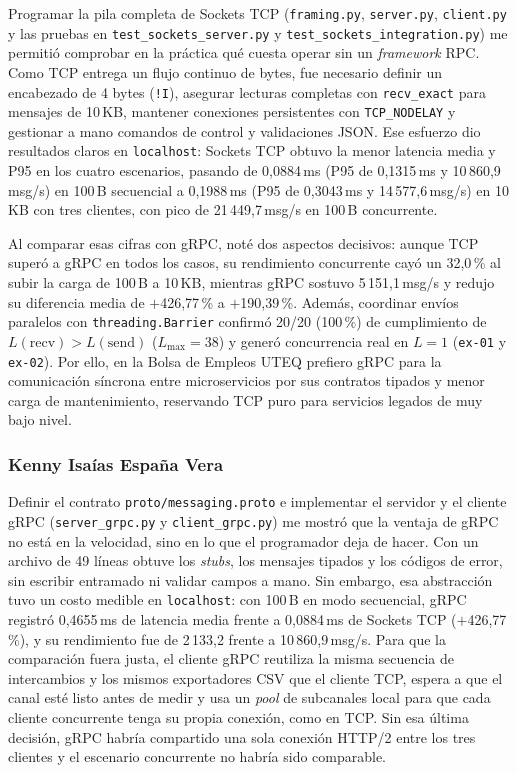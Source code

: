 \documentclass[12pt,a4paper]{article}
\begin{document}
Programar la pila completa de Sockets TCP (\texttt{framing.py}, \texttt{server.py}, \texttt{client.py} y las pruebas en \texttt{test\_sockets\_server.py} y \texttt{test\_sockets\_integration.py}) me permitió comprobar en la práctica qué cuesta operar sin un \emph{framework} RPC. Como TCP entrega un flujo continuo de bytes, fue necesario definir un encabezado de 4 bytes (\texttt{!I}), asegurar lecturas completas con \texttt{recv\_exact} para mensajes de 10\,KB, mantener conexiones persistentes con \texttt{TCP\_NODELAY} y gestionar a mano comandos de control y validaciones JSON. Ese esfuerzo dio resultados claros en \texttt{localhost}: Sockets TCP obtuvo la menor latencia media y P95 en los cuatro escenarios, pasando de 0,0884\,ms (P95 de 0,1315\,ms y 10\,860,9\,msg/s) en 100\,B secuencial a 0,1988\,ms (P95 de 0,3043\,ms y 14\,577,6\,msg/s) en 10\,KB con tres clientes, con pico de 21\,449,7\,msg/s en 100\,B concurrente.

Al comparar esas cifras con gRPC, noté dos aspectos decisivos: aunque TCP superó a gRPC en todos los casos, su rendimiento concurrente cayó un 32,0\,\% al subir la carga de 100\,B a 10\,KB, mientras gRPC sostuvo 5\,151,1\,msg/s y redujo su diferencia media de $+$426,77\,\% a $+$190,39\,\%. Además, coordinar envíos paralelos con \texttt{threading.Barrier} confirmó 20/20 (100\,\%) de cumplimiento de $L(\mathrm{recv}) > L(\mathrm{send})$ ($L_{\max}=38$) y generó concurrencia real en $L=1$ (\texttt{ex-01} y \texttt{ex-02}). Por ello, en la Bolsa de Empleos UTEQ prefiero gRPC para la comunicación síncrona entre microservicios por sus contratos tipados y menor carga de mantenimiento, reservando TCP puro para servicios legados de muy bajo nivel.

\subsubsection*{Kenny Isaías España Vera}

Definir el contrato \texttt{proto/messaging.proto} e implementar el servidor y el cliente gRPC (\texttt{server\_grpc.py} y \texttt{client\_grpc.py}) me mostró que la ventaja de gRPC no está en la velocidad, sino en lo que el programador deja de hacer. Con un archivo de 49 líneas obtuve los \emph{stubs}, los mensajes tipados y los códigos de error, sin escribir entramado ni validar campos a mano. Sin embargo, esa abstracción tuvo un costo medible en \texttt{localhost}: con 100\,B en modo secuencial, gRPC registró 0,4655\,ms de latencia media frente a 0,0884\,ms de Sockets TCP ($+$426,77\,\%), y su rendimiento fue de 2\,133,2 frente a 10\,860,9\,msg/s. Para que la comparación fuera justa, el cliente gRPC reutiliza la misma secuencia de intercambios y los mismos exportadores CSV que el cliente TCP, espera a que el canal esté listo antes de medir y usa un \emph{pool} de subcanales local para que cada cliente concurrente tenga su propia conexión, como en TCP. Sin esa última decisión, gRPC habría compartido una sola conexión HTTP/2 entre los tres clientes y el escenario concurrente no habría sido comparable.
\end{document}
